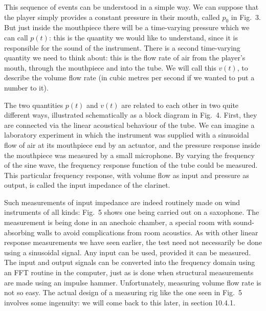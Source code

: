   This sequence of events can be understood in a simple way. We can suppose 
  that the player simply provides a constant pressure in their mouth, called 
  $p_0$ in Fig.\ 3. But just inside the mouthpiece there will be a time-varying 
  pressure which we can call $p(t)$: this is the quantity we would like to 
  understand, since it is responsible for the sound of the instrument. There is 
  a second time-varying quantity we need to think about: this is the flow rate 
  of air from the player’s mouth, through the mouthpiece and into the tube. We 
  will call this $v(t)$, to describe the volume flow rate (in cubic metres per 
  second if we wanted to put a number to it). 

  The two quantities $p(t)$ and $v(t)$ are related to each other in two quite 
  different ways, illustrated schematically as a block diagram in Fig.\ 4. 
  First, they are connected via the linear acoustical behaviour of the tube. We 
  can imagine a laboratory experiment in which the instrument was supplied with 
  a sinusoidal flow of air at its mouthpiece end by an actuator, and the 
  pressure response inside the mouthpiece was measured by a small microphone. 
  By varying the frequency of the sine wave, the frequency response function of 
  the tube could be measured. This particular frequency response, with volume 
  flow as input and pressure as output, is called the input impedance of the 
  clarinet. 


  Such measurements of input impedance are indeed routinely made on wind 
  instruments of all kinds: Fig.\ 5 shows one being carried out on a saxophone. 
  The measurement is being done in an anechoic chamber, a special room with 
  sound-absorbing walls to avoid complications from room acoustics. As with 
  other linear response measurements we have seen earlier, the test need not 
  necessarily be done using a sinusoidal signal. Any input can be used, 
  provided it can be measured. The input and output signals can be converted 
  into the frequency domain using an FFT routine in the computer, just as is 
  done when structural measurements are made using an impulse hammer. 
  Unfortunately, measuring volume flow rate is not so easy. The actual design 
  of a measuring rig like the one seen in Fig.\ 5 involves some ingenuity: we 
  will come back to this later, in section 10.4.1. 


